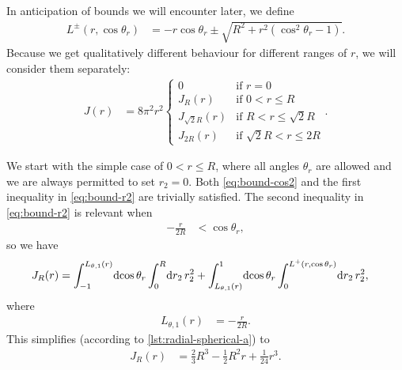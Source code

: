 In anticipation of bounds we will encounter later, we define
\begin{align}
	L^\pm(r, \cos{\theta_r})
	&= -r \cos{\theta_r} \pm \sqrt{R^2 + r^2 (\cos^2{\theta_r} - 1)}.
\end{align}
Because we get qualitatively different behaviour for different ranges of $r$, we will consider them separately:
\begin{align}
	J(r)
	&= 8 \pi^2 r^2 \begin{cases}
			0 & \text{if } r = 0 \\
			J_R(r) & \text{if } 0 < r \le R \\
			J_{\sqrt{2} R}(r) & \text{if } R < r \le \sqrt{2} R \\
			J_{2 R}(r) & \text{if } \sqrt{2} R < r \le 2 R
		\end{cases}.
\end{align}

We start with the simple case of $0 < r \le R$, where all angles $\theta_r$ are allowed and we are always permitted to set $r_2 = 0$.
Both \cref{eq:bound-cos2} and the first inequality in \cref{eq:bound-r2} are trivially satisfied.
The second inequality in \cref{eq:bound-r2} is relevant when
\begin{align}
	-\frac{r}{2 R}
	&< \cos{\theta_r},
\end{align}
so we have
\begin{align}
	J_R(r)
	&= \int_{-1}^{L_{\theta,1}(r)}\! \dif \cos{\theta_r} \int_0^R\! \dif r_2 \, r_2^2
		+ \int_{L_{\theta,1}(r)}^{1}\! \dif \cos{\theta_r} \int_0^{L^+(r, \cos{\theta_r})}\! \dif r_2 \, r_2^2,
			\label{eq:radial-spherical-a}
\end{align}
where
\begin{align}
	L_{\theta,1}(r)
	&= -\frac{r}{2 R}.
\end{align}
This simplifies (according to \vref{lst:radial-spherical-a}) to
\begin{align}
	J_R(r)
	&= \frac{2}{3} R^3 - \frac{1}{2} R^2 r + \frac{1}{24} r^3.
\end{align}

